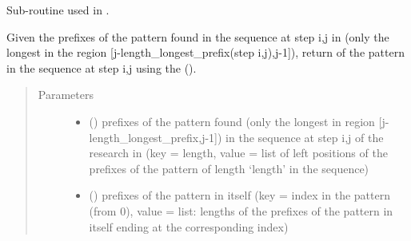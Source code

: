 \documentclass[letterpaper,10pt,english]{sphinxmanual}
\begin{document}
\begin{fulllineitems}
\label{\detokenize{index:PrefixIndexing.add_shorter_prefixes}}
Sub-routine used in {\hyperref[\detokenize{index:PrefixIndexing.prefix_indexing}]{}}.

Given the prefixes of the pattern found  in the sequence at step i,j in {\hyperref[\detokenize{index:PrefixIndexing.prefix_indexing}]{}} (only the longest in the region {[}j-length\_longest\_prefix(step i,j),j-1{]}),
return  of the pattern in the sequence at step i,j
using the  ({\hyperref[\detokenize{index:PrefixIndexing.failure_function_and_right_pos_prefixes}]{}}).
\begin{quote}\begin{description}
\item[{Parameters}] \leavevmode\begin{itemize}
\item {} 
 (\sphinxstyleliteralemphasis{ (}\sphinxstyleliteralemphasis{)}) \textendash{} prefixes of the pattern found  (only the longest in region {[}j-length\_longest\_prefix,j-1{]}) in the sequence at step i,j of the research in  (key = length, value = list of left positions of the prefixes of the pattern of length ‘length’ in the sequence)

\item {} 
 (\sphinxstyleliteralemphasis{ (}\sphinxstyleliteralemphasis{)}) \textendash{} prefixes of the pattern in itself  {\hyperref[\detokenize{index:PrefixIndexing.failure_function_and_right_pos_prefixes}]{}} (key = index in the pattern (from 0), value = list: lengths of the prefixes of the pattern in itself ending at the corresponding index)


\end{itemize}
\end{description}
\end{quote}
\end{fulllineitems}
\end{document}
